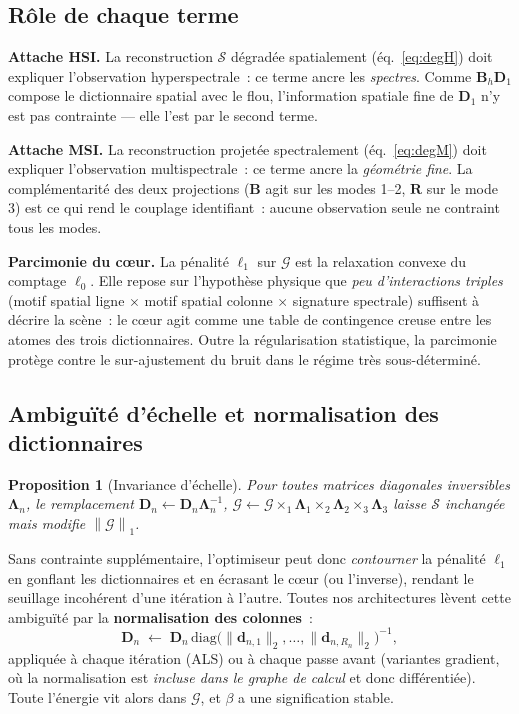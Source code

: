 \documentclass[11pt,a4paper]{article}
\newtheorem{proposition}{Proposition}
\newcommand{\T}[1]{\bm{\mathcal{#1}}}          %
\newcommand{\M}[1]{\bm{#1}}                     %
\newcommand{\noru}[1]{\left\lVert #1 \right\rVert_1}
\begin{document}
\subsection{Rôle de chaque terme}

\textbf{Attache HSI.} La reconstruction $\T{S}$ dégradée spatialement
(éq.~\ref{eq:degH}) doit expliquer l'observation hyperspectrale~: ce terme
ancre les \emph{spectres}. Comme $\M{B}_h\M{D}_1$ compose le dictionnaire
spatial avec le flou, l'information spatiale fine de $\M{D}_1$ n'y est pas
contrainte — elle l'est par le second terme.

\textbf{Attache MSI.} La reconstruction projetée spectralement
(éq.~\ref{eq:degM}) doit expliquer l'observation multispectrale~: ce terme
ancre la \emph{géométrie fine}. La complémentarité des deux projections
($\M{B}$ agit sur les modes 1--2, $\M{R}$ sur le mode 3) est ce qui rend le
couplage identifiant~: aucune observation seule ne contraint tous les modes.

\textbf{Parcimonie du c\oe ur.} La pénalité $\ell_1$ sur $\T{G}$ est la
relaxation convexe du comptage $\ell_0$. Elle repose sur l'hypothèse physique
que \emph{peu d'interactions triples} (motif spatial ligne $\times$ motif
spatial colonne $\times$ signature spectrale) suffisent à décrire la scène~:
le c\oe ur agit comme une table de contingence creuse entre les atomes des
trois dictionnaires. Outre la régularisation statistique, la parcimonie
protège contre le sur-ajustement du bruit dans le régime très sous-déterminé.

\subsection{Ambiguïté d'échelle et normalisation des dictionnaires}
\label{sec:ambiguity}

\begin{proposition}[Invariance d'échelle]
Pour toutes matrices diagonales inversibles $\M{\Lambda}_n$, le remplacement
$\M{D}_n \leftarrow \M{D}_n\M{\Lambda}_n^{-1}$,
$\T{G} \leftarrow \T{G}\times_1\M{\Lambda}_1\times_2\M{\Lambda}_2
\times_3\M{\Lambda}_3$ laisse $\T{S}$ inchangée mais modifie $\noru{\T{G}}$.
\end{proposition}

Sans contrainte supplémentaire, l'optimiseur peut donc \emph{contourner} la
pénalité $\ell_1$ en gonflant les dictionnaires et en écrasant le c\oe ur
(ou l'inverse), rendant le seuillage incohérent d'une itération à l'autre.
Toutes nos architectures lèvent cette ambiguïté par la \textbf{normalisation
des colonnes}~:
\begin{equation}
  \M{D}_n \;\longleftarrow\; \M{D}_n\,
  \mathrm{diag}\bigl(\lVert \M{d}_{n,1}\rVert_2,\dots,
  \lVert \M{d}_{n,R_n}\rVert_2\bigr)^{-1},
  \label{eq:normcols}
\end{equation}
appliquée à chaque itération (ALS) ou à chaque passe avant (variantes
gradient, où la normalisation est \emph{incluse dans le graphe de calcul} et
donc différentiée). Toute l'énergie vit alors dans $\T{G}$, et $\beta$ a une
signification stable.
\end{document}
